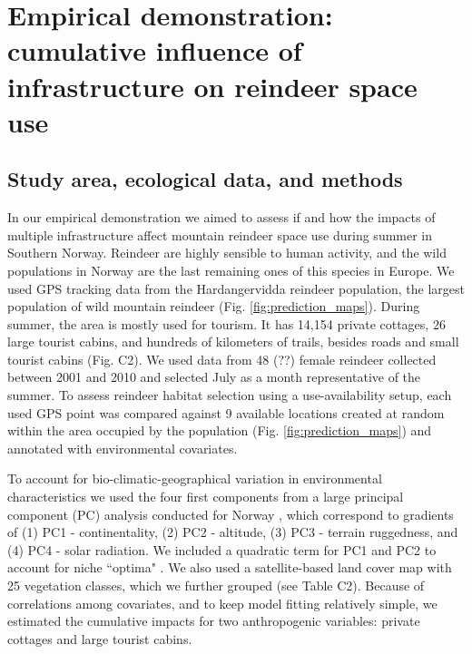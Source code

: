 \documentclass[titlepage]{article}
\begin{document}
\section{Empirical demonstration: cumulative influence of infrastructure on reindeer space use}

\subsection{Study area, ecological data, and methods}

In our empirical demonstration we aimed to assess if and how the impacts of multiple infrastructure affect mountain reindeer space use during summer in Southern Norway. Reindeer are highly sensible to human activity, and the wild populations in Norway are the last remaining ones of this species in Europe. We used GPS tracking data from the Hardangervidda reindeer population, the largest population of wild mountain reindeer (Fig. \ref{fig:prediction_maps}). During summer, the area is mostly used for tourism. It has 14,154 private cottages, 26 large tourist cabins, and hundreds of kilometers of trails, besides roads and small tourist cabins (Fig. C2). We used data from 48 (??) female reindeer collected between 2001 and 2010 \citep[see][for further details]{panzacchi_searching_2015} and selected July as a month representative of the summer. To assess reindeer habitat selection using a use-availability setup, each used GPS point was compared against 9 available locations created at random within the area occupied by the population (Fig. \ref{fig:prediction_maps}) and annotated with environmental covariates.

To account for bio-climatic-geographical variation in environmental characteristics we used the four first components from a large principal component (PC) analysis conducted for Norway \citep{bakkestuen_step-less_2008}, which correspond to gradients of (1) PC1 - continentality, (2) PC2 - altitude, (3) PC3 - terrain ruggedness, and (4) PC4 - solar radiation. We included a quadratic term for PC1 and PC2 to account for niche ``optima" \citep[\textit{sensu}][]{panzacchi_searching_2015}. We also used a satellite-based land cover map with 25 vegetation classes, which we further grouped (see Table C2). Because of correlations among covariates, and to keep model fitting relatively simple, we estimated the cumulative impacts for two anthropogenic variables: private cottages and large tourist cabins.
\end{document}

